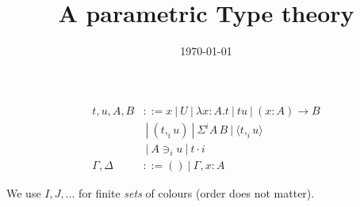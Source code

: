 \documentclass[10pt,a4paper]{article}
\title{A parametric Type theory}
\author{}
\date{\today}
\newcommand\CP[3]{(#2,_{#1} #3)}
\newcommand\param[1]{\!\cdot\!#1}
\newcommand\op[1]{∋_{#1}}
\newcommand\ip[3]{Σ^{#1} {#2}\,{#3}}
\newcommand\fp[3]{⟨#2 ,_{#1} #3⟩}
\begin{document}
\maketitle


\begin{definition}
  
  \begin{align*}
    t,u,A,B & ::= x ~|~ U ~|~ λx:A. t      ~|~ t u ~|~ (x:A) → B \\
            & ~|~ \CP i t u  ~|~ \ip i A B  ~|~ \fp i t u \\
            & ~|~ A \op i u ~|~ t \param i  \\
    \Gamma,\Delta & ::= () ~|~ \Gamma,x:A
  \end{align*}
\end{definition}

We use $I,J,…$ for finite {\em sets} of colours (order does not matter).
\end{document}
